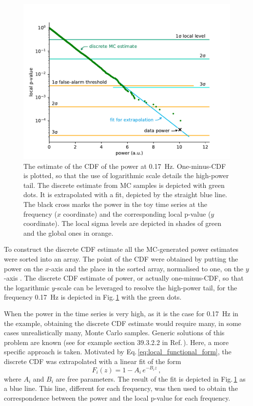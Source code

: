 \begin{figure}
  \centering
  \includegraphics[width=\linewidth]{gfx/axions/MC_estimation_local.pdf}
  \caption{The estimate of the CDF of the power at \SI{0.17}{\hertz}. One-minus-CDF is plotted, so that the use of logarithmic scale details the high-power tail. The discrete estimate from MC samples is depicted with green dots. It is extrapolated with a fit, depicted by the straight blue line. The black cross marks the power in the toy time series at the frequency ($x$ coordinate) and the corresponding local p-value ($y$ coordinate). The local sigma levels are depicted in shades of green and the global ones in orange.}\label{fig:P_best_signal_candidate}
\end{figure}

To construct the discrete CDF estimate all the MC-generated power estimates were sorted into an array. The point of the CDF were obtained by putting the power on the $x$-axis and the place in the sorted array, normalised to one, on the $y$-axis .
The discrete CDF estimate of power, or actually one-minus-CDF, so that the logarithmic $y$-scale can be leveraged to resolve the high-power tail, for the frequency \SI{0.17}{\hertz} is depicted in Fig.\,\ref{fig:P_best_signal_candidate} with the green dots.

When the power in the time series is very high, as it is the case for \SI{0.17}{\hertz} in the example, obtaining the discrete CDF estimate would require many, in some cases unrealistically many, Monte Carlo samples. Generic solutions of this problem are known (see for example section 39.3.2.2 in Ref.\,\cite{PDG2016}). Here, a more specific approach is taken. Motivated by Eq.\,\ref{eq:local_functional_form}, the discrete CDF was extrapolated with a linear fit of the form
\begin{equation}
  F_i(z) = 1 - A_i \, e^{-B_i z} \ ,
\end{equation}
where $A_i$ and $B_i$ are free parameters. The result of the fit is depicted in Fig.\,\ref{fig:P_best_signal_candidate} as a blue line. This line, different for each frequency, was then used to obtain the correspondence between the power and the local p-value for each frequency.


